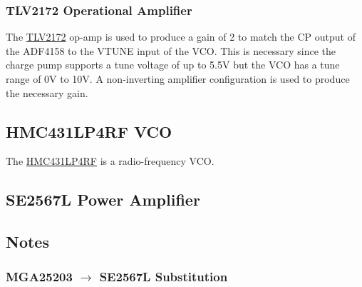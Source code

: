 \subsubsection{TLV2172 Operational Amplifier}
\label{sec:tlv2172-op-amp}

The \href{http://www.ti.com/lit/ds/symlink/tlv172.pdf}{TLV2172} op-amp is used to produce a gain of
2 to match the CP output of the ADF4158 to the VTUNE input of the VCO. This is necessary since the
charge pump supports a tune voltage of up to 5.5V but the VCO has a tune range of 0V to 10V. A
non-inverting amplifier configuration is used to produce the necessary gain.

\subsection{HMC431LP4RF VCO}
\label{sec:hmc431lp4rf}

The
\href{http://www.analog.com/media/en/technical_documentation/data_sheets/hmc431.pdf}{HMC431LP4RF} is
a radio-frequency VCO.

\subsection{SE2567L Power Amplifier}
\label{sec:se2567l-power-amp}

\subsection{Notes}
\label{sec:notes}

\subsubsection{MGA25203 $\rightarrow$ SE2567L Substitution}
\label{sec:mga25203-se2567l-sub}


